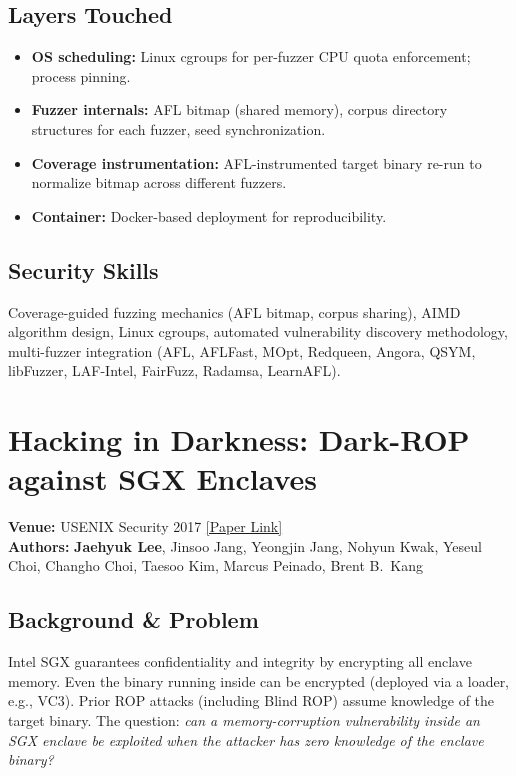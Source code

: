 \documentclass[11pt,letterpaper]{article}
\begin{document}
\subsection*{Layers Touched}
\begin{itemize}
    \item \textbf{OS scheduling:} Linux cgroups for per-fuzzer CPU quota enforcement; process pinning.
    \item \textbf{Fuzzer internals:} AFL bitmap (shared memory), corpus directory structures for each fuzzer, seed synchronization.
    \item \textbf{Coverage instrumentation:} AFL-instrumented target binary re-run to normalize bitmap across different fuzzers.
    \item \textbf{Container:} Docker-based deployment for reproducibility.
\end{itemize}

\subsection*{Security Skills}
Coverage-guided fuzzing mechanics (AFL bitmap, corpus sharing), AIMD algorithm design, Linux cgroups, automated vulnerability discovery methodology, multi-fuzzer integration (AFL, AFLFast, MOpt, Redqueen, Angora, QSYM, libFuzzer, LAF-Intel, FairFuzz, Radamsa, LearnAFL).

\newpage

\section{Hacking in Darkness: Dark-ROP against SGX Enclaves}
\textbf{Venue:} USENIX Security 2017 \hfill
\href{https://www.usenix.org/system/files/conference/usenixsecurity17/sec17-lee-jaehyuk.pdf}{[Paper Link]}\\
\textbf{Authors:} \textbf{Jaehyuk Lee}, Jinsoo Jang, Yeongjin Jang, Nohyun Kwak, Yeseul Choi, Changho Choi, Taesoo Kim, Marcus Peinado, Brent B.\ Kang

\subsection*{Background \& Problem}
Intel SGX guarantees confidentiality and integrity by encrypting all enclave memory.
Even the binary running inside can be encrypted (deployed via a loader, e.g., VC3).
Prior ROP attacks (including Blind ROP) assume knowledge of the target binary.
The question: \emph{can a memory-corruption vulnerability inside an SGX enclave be exploited when the attacker has zero knowledge of the enclave binary?}
\end{document}
